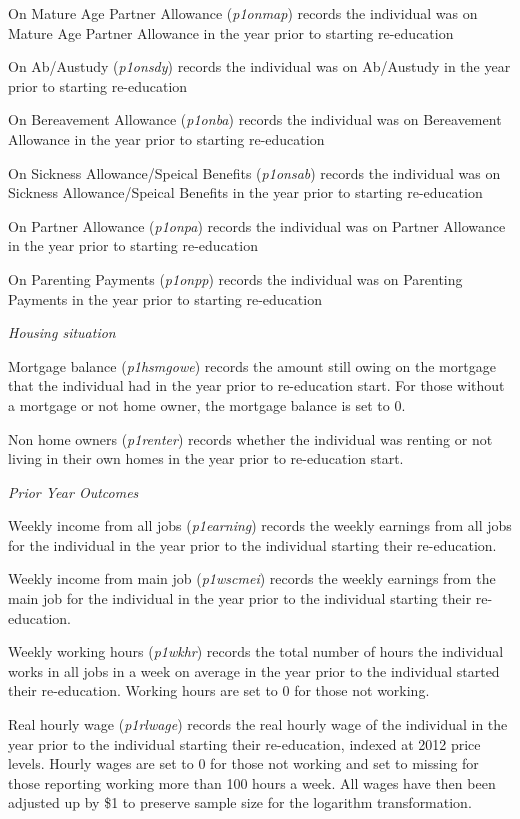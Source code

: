 \documentclass[12pt, a4paper]{article}
\begin{document}
On Mature Age Partner Allowance (\textit{p1\textunderscore{}onmap}) records the individual was on Mature Age Partner Allowance in the year prior to starting re-education

On Ab/Austudy (\textit{p1\textunderscore{}onsdy}) records the individual was on Ab/Austudy in the year prior to starting re-education

On Bereavement Allowance (\textit{p1\textunderscore{}onba}) records the individual was on Bereavement Allowance in the year prior to starting re-education

On Sickness Allowance/Speical Benefits (\textit{p1\textunderscore{}onsab}) records the individual was on Sickness Allowance/Speical Benefits in the year prior to starting re-education

On Partner Allowance (\textit{p1\textunderscore{}onpa}) records the individual was on Partner Allowance in the year prior to starting re-education

On Parenting Payments (\textit{p1\textunderscore{}onpp}) records the individual was on Parenting Payments in the year prior to starting re-education

\emph{Housing situation}

Mortgage balance (\textit{p1\textunderscore{}hsmgowe}) records the amount still owing on the mortgage that the individual had in the year prior to re-education start. For those without a mortgage or not home owner, the mortgage balance is set to 0. 

Non home owners (\textit{p1\textunderscore{}renter}) records whether the individual was renting or not living in their own homes in the year prior to re-education start.


\emph{Prior Year Outcomes}

Weekly income from all jobs (\textit{p1\textunderscore{}earning}) records the weekly earnings from all jobs for the individual in the year prior to the individual starting their re-education. 

Weekly income from main job (\textit{p1\textunderscore{}wscmei}) records the weekly earnings from the main job for the individual in the year prior to the individual starting their re-education.
 
Weekly working hours (\textit{p1\textunderscore{}wkhr}) records the total number of hours the individual works in all jobs in a week on average in the year prior to the individual started their re-education. Working hours are set to 0 for those not working. 

Real hourly wage (\textit{p1\textunderscore{}rlwage}) records the real hourly wage of the individual in the year prior to the individual starting their re-education, indexed at 2012 price levels. Hourly wages are set to 0 for those not working and set to missing for those reporting working more than 100 hours a week. All wages have then been adjusted up by \$1 to preserve sample size for the logarithm transformation. 
\end{document}
